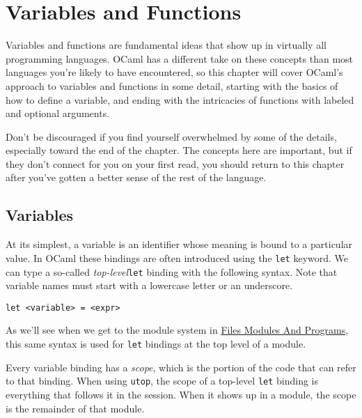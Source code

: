 \hypertarget{variables-and-functions}{%
\section{Variables and Functions}\label{variables-and-functions}}

Variables and functions are fundamental ideas that show up in virtually
all programming languages. OCaml has a different take on these concepts
than most languages you're likely to have encountered, so this chapter
will cover OCaml's approach to variables and functions in some detail,
starting with the basics of how to define a variable, and ending with
the intricacies of functions with labeled and optional arguments.

Don't be discouraged if you find yourself overwhelmed by some of the
details, especially toward the end of the chapter. The concepts here are
important, but if they don't connect for you on your first read, you
should return to this chapter after you've gotten a better sense of the
rest of the language.

\hypertarget{variables}{%
\subsection{Variables}\label{variables}}

At its simplest, a variable is an identifier whose meaning is bound to a
particular value. In OCaml these bindings are often introduced using the
\passthrough{\lstinline!let!} keyword. We can type a so-called
\emph{top-level}\passthrough{\lstinline!let!} binding with the following
syntax. Note that variable names must start with a lowercase letter or
an underscore.

\begin{lstlisting}
let <variable> = <expr>
\end{lstlisting}

As we'll see when we get to the module system in
\href{files-modules-and-programs.html\#files-modules-and-programs}{Files
Modules And Programs}, this same syntax is used for
\passthrough{\lstinline!let!} bindings at the top level of a module.

Every variable binding has a \emph{scope}, which is the portion of the
code that can refer to that binding. When using
\passthrough{\lstinline!utop!}, the scope of a top-level
\passthrough{\lstinline!let!} binding is everything that follows it in
the session. When it shows up in a module, the scope is the remainder of
that module.

